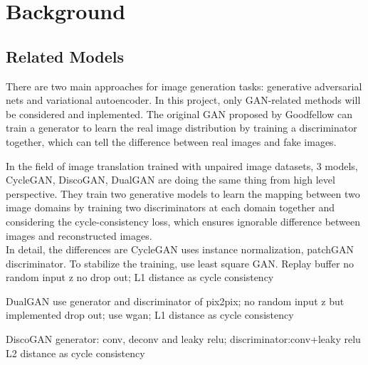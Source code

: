 \chapter{Background}\label{Ch:Background}
\section{Related Models}
There are two main approaches for image generation tasks: generative adversarial nets and variational autoencoder. In this project, only GAN-related methods will be considered and inplemented.
The original GAN proposed by Goodfellow can train a generator to learn the real image distribution by training a discriminator together, which can tell the difference between real images and fake images.

In the field of image translation trained with unpaired image datasets, 3 models, CycleGAN, DiscoGAN, DualGAN are doing the same thing
from high level perspective. They train two generative models to learn the mapping between two image domains by training two discriminators
at each domain together and considering the cycle-consistency loss, which ensures ignorable difference between images and reconstructed images.
\\
In detail, the differences are
CycleGAN uses instance normalization, patchGAN discriminator. To stabilize the training, use least square GAN. Replay buffer
              no random input z no drop out; L1 distance as cycle consistency

DualGAN use generator and discriminator of pix2pix; no random input z but implemented drop out; use wgan;
             L1 distance as cycle consistency

DiscoGAN generator: conv, deconv and leaky relu; discriminator:conv+leaky relu  L2 distance as cycle consistency


\endinput

